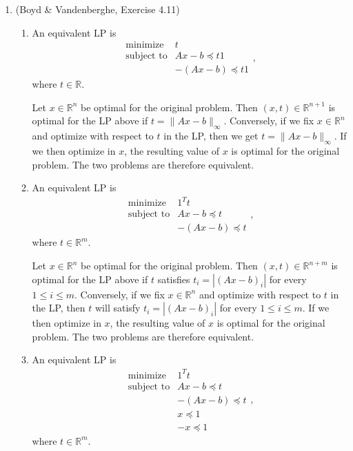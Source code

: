 \documentclass[letterpaper,12pt]{article}
\begin{document}
\begin{enumerate}
\item (Boyd \& Vandenberghe, Exercise 4.11)
\begin{enumerate}
\item An equivalent LP is
  \begin{equation*}
    \begin{array}{ll}
      \text{minimize} & t \\
      \text{subject to}
        & Ax - b \preceq t1 \\
        &-(Ax - b) \preceq t1
    \end{array},
  \end{equation*}
  where $t \in \mathbb{R}$.

  Let $x \in \mathbb{R}^n$ be optimal for the original problem. Then
  $(x, t) \in \mathbb{R}^{n+1}$ is optimal for the LP above if
  $t = \lVert Ax - b \rVert_\infty$. Conversely, if we fix
  $x \in \mathbb{R}^n$ and optimize with respect to $t$ in the LP,
  then we get $t = \lVert Ax - b \rVert_\infty$. If we then optimize
  in $x$, the resulting value of $x$ is optimal for the original
  problem. The two problems are therefore equivalent.

\item An equivalent LP is
  \begin{equation*}
    \begin{array}{ll}
      \text{minimize} & 1^T t \\
      \text{subject to}
        & Ax - b \preceq t \\
        &-(Ax - b) \preceq t
    \end{array},
  \end{equation*}
  where $t \in \mathbb{R}^m$.

  Let $x \in \mathbb{R}^n$ be optimal for the original problem. Then
  $(x, t) \in \mathbb{R}^{n+m}$ is optimal for the LP above if $t$
  satisfies $t_i = |(Ax - b)_i|$ for every $1 \leq i \leq
  m$. Conversely, if we fix $x \in \mathbb{R}^n$ and optimize with
  respect to $t$ in the LP, then $t$ will satisfy $t_i = |(Ax - b)_i|$
  for every $1 \leq i \leq m$. If we then optimize in $x$, the
  resulting value of $x$ is optimal for the original problem. The two
  problems are therefore equivalent.

\item An equivalent LP is
  \begin{equation*}
    \begin{array}{ll}
      \text{minimize} & 1^T t \\
      \text{subject to}
        & Ax - b \preceq t \\
        &-(Ax - b) \preceq t \\
        &x \preceq 1 \\
        &-x \preceq 1
    \end{array},
  \end{equation*}
  where $t \in \mathbb{R}^m$.


\end{enumerate}
\end{enumerate}
\end{document}

